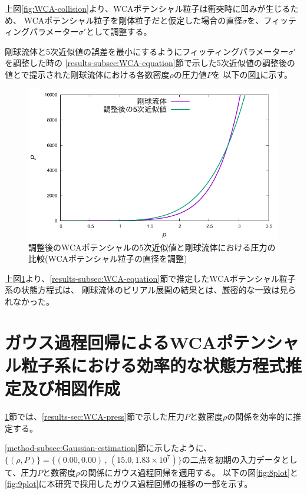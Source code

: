 \documentclass[titlepage]{jsreport}
\begin{document}
{{{\newpage
上図\ref{fig:WCA-collision}より、WCAポテンシャル粒子は衝突時に凹みが生じるため、
WCAポテンシャル粒子を剛体粒子だと仮定した場合の直径$\sigma$を、フィッティングパラメーター${\sigma}'$として調整する。

剛球流体と5次近似値の誤差を最小にするようにフィッティングパラメーター${\sigma}'$を調整した時の
\ref{results-subsec:WCA-equation}節で示した5次近似値の調整後の値と\cite{hard-sphere}で提示された剛球流体における各数密度$\rho$の圧力値$P$を
以下の図\ref{fig:fit_compare_previous-research}に示す。

\begin{figure}[htbp]
    \begin{center}
        \includegraphics[width=14cm]{fig/fit_compare_previous-research.pdf}
    \end{center}
    \caption{調整後のWCAポテンシャルの5次近似値と剛球流体における圧力の比較(WCAポテンシャル粒子の直径を調整)}
    \label{fig:fit_compare_previous-research}
\end{figure}

\newpage
上図\ref{fig:fit_compare_previous-research}より、\ref{results-subsec:WCA-equation}節で推定したWCAポテンシャル粒子系の状態方程式は、
剛球流体のビリアル展開の結果とは、厳密的な一致は見られなかった。

\section{ガウス過程回帰によるWCAポテンシャル粒子系における効率的な状態方程式推定及び相図作成}\label{results-sec:Gauss}
\ref{results-sec:Gauss}節では、\ref{results-sec:WCA-press}節で示した圧力$P$と数密度$\rho$の関係を効率的に推定する。

\ref{method-subsec:Gaussian-estimation}節に示したように、$\{(\rho,P)\}=\{(0.00,0.00)\,,\,(15.0,1.83×10^7)\}$の二点を初期の入力データとして、圧力$P$と数密度$\rho$の関係にガウス過程回帰を適用する。
以下の図\ref{fig:8plot}と\ref{fig:9plot}に本研究で採用したガウス過程回帰の推移の一部を示す。


}}}
\end{document}

